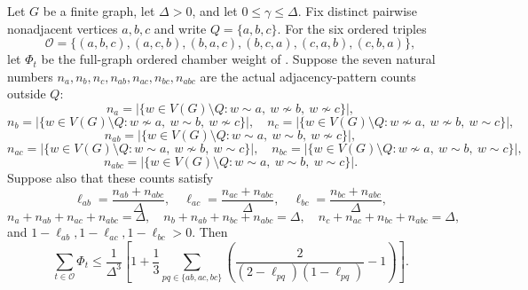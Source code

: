 \begin{helper}
Let $G$ be a finite graph, let $\Delta>0$, and let
$0\le\gamma\le\Delta$.  Fix distinct pairwise nonadjacent vertices
$a,b,c$ and write $Q=\{a,b,c\}$.  For the six ordered triples
\[
\mathcal O=\{(a,b,c),(a,c,b),(b,a,c),(b,c,a),(c,a,b),(c,b,a)\},
\]
let $\Phi_t$ be the full-graph ordered chamber weight of
.  Suppose the seven
natural numbers $n_a,n_b,n_c,n_{ab},n_{ac},n_{bc},n_{abc}$ are the actual
adjacency-pattern counts outside $Q$:
\[
n_a=|\{w\in V(G)\setminus Q:w\sim a,\ w\not\sim b,\ w\not\sim c\}|,
\]
\[
n_b=|\{w\in V(G)\setminus Q:w\not\sim a,\ w\sim b,\ w\not\sim c\}|,\quad
n_c=|\{w\in V(G)\setminus Q:w\not\sim a,\ w\not\sim b,\ w\sim c\}|,
\]
\[
n_{ab}=|\{w\in V(G)\setminus Q:w\sim a,\ w\sim b,\ w\not\sim c\}|,
\]
\[
n_{ac}=|\{w\in V(G)\setminus Q:w\sim a,\ w\not\sim b,\ w\sim c\}|,\quad
n_{bc}=|\{w\in V(G)\setminus Q:w\not\sim a,\ w\sim b,\ w\sim c\}|,
\]
\[
n_{abc}=|\{w\in V(G)\setminus Q:w\sim a,\ w\sim b,\ w\sim c\}|.
\]
Suppose also that these counts satisfy
\[
\ell_{ab}=\frac{n_{ab}+n_{abc}}{\Delta},\quad
\ell_{ac}=\frac{n_{ac}+n_{abc}}{\Delta},\quad
\ell_{bc}=\frac{n_{bc}+n_{abc}}{\Delta},
\]
\[
n_a+n_{ab}+n_{ac}+n_{abc}=\Delta,\quad
n_b+n_{ab}+n_{bc}+n_{abc}=\Delta,\quad
n_c+n_{ac}+n_{bc}+n_{abc}=\Delta,
\]
and $1-\ell_{ab},1-\ell_{ac},1-\ell_{bc}>0$.  Then
\[
\sum_{t\in\mathcal O}\Phi_t
\le
\frac1{\Delta^3}\left[
1+\frac13\sum_{pq\in\{ab,ac,bc\}}
\left(\frac{2}{(2-\ell_{pq})(1-\ell_{pq})}-1\right)\right].
\]
\end{helper}
